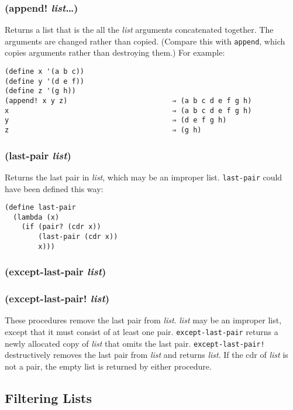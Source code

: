 \documentclass{article}
\begin{document}
\subsubsection{(append! \emph{list}\ldots{})}

Returns a list that is the all the \emph{list} arguments concatenated together. The arguments
are changed rather than copied. (Compare this with \verb|append|, which copies arguments
rather than destroying them.) For example:

\begin{verbatim}
(define x '(a b c))
(define y '(d e f))
(define z '(g h))
(append! x y z)                         ⇒ (a b c d e f g h)
x                                       ⇒ (a b c d e f g h)
y                                       ⇒ (d e f g h)
z                                       ⇒ (g h)
\end{verbatim}

\subsubsection{(last-pair \emph{list})}

Returns the last pair in \emph{list}, which may be an improper list. \verb|last-pair| could
have been defined this way:

\begin{verbatim}
(define last-pair
  (lambda (x)
    (if (pair? (cdr x))
        (last-pair (cdr x))
        x)))
\end{verbatim}

\subsubsection{(except-last-pair \emph{list})}

\subsubsection{(except-last-pair! \emph{list})}

These procedures remove the last pair from \emph{list}. \emph{list} may be an improper list,
except that it must consist of at least one pair. \verb|except-last-pair| returns a newly
allocated copy of \emph{list} that omits the last pair. \verb|except-last-pair!|
destructively removes the last pair from \emph{list} and returns \emph{list}. If the cdr of
\emph{list} is not a pair, the empty list is returned by either procedure.

\subsection{Filtering Lists}\label{sec:filtering-lists}
\end{document}
